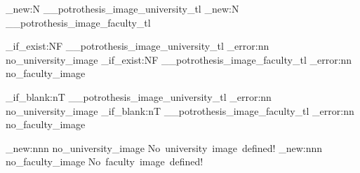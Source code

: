 \ExplSyntaxOn

\tl_new:N \g__potrothesis_image_university_tl
\tl_new:N \g__potrothesis_image_faculty_tl

\NewDocumentCommand{}

\NewDocumentCommand{}

\ifmit@spanish
	\cs_if_exist:NF \g__potrothesis_image_university_tl { \msg_error:nn { \ClassName } { no_university_image } }
	\cs_if_exist:NF \g__potrothesis_image_faculty_tl { \msg_error:nn { \ClassName } { no_faculty_image } }

	\tl_if_blank:nT { \g__potrothesis_image_university_tl } { \msg_error:nn { \ClassName } { no_university_image } }
	\tl_if_blank:nT { \g__potrothesis_image_faculty_tl } { \msg_error:nn { \ClassName } { no_faculty_image } }
\fi

\msg_new:nnn { \ClassName } { no_university_image } { No~university~image~defined! }
\msg_new:nnn { \ClassName }{ no_faculty_image } { No~faculty~image~defined! }

